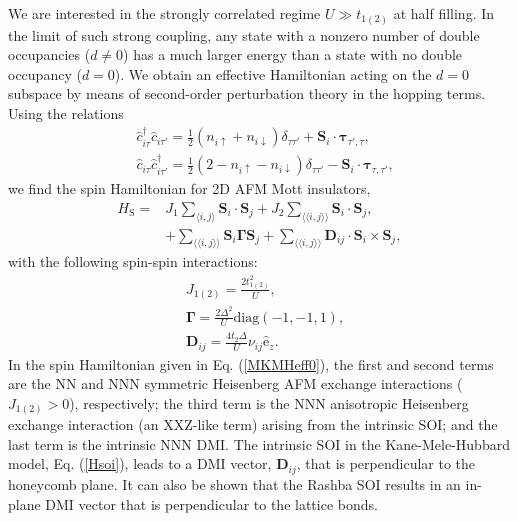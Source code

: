 \documentclass[aps,prl,twocolumn,amsmath,amssymb,nobibnotes]{revtex4-1}%
\newcommand{\n}{\nonumber}
\newcommand{\bs}{\boldsymbol}
\begin{document}
We are interested in the strongly correlated regime $U\gg t_{1(2)}$ at half filling. In the limit of such strong coupling, any state with a nonzero number of double occupancies ($d \neq 0$) has a much larger energy than a state with no double occupancy ($d=0$). We obtain an effective Hamiltonian acting on the $d=0$ subspace by means of second-order perturbation theory in the hopping terms. Using the relations
\begin{subequations}
\label{SpinOperatorInv1}
\begin{align}
&\hat{c}_{i \tau}^\dagger \hat{c}_{i \tau'} = \frac{1}{2} (n_{i \uparrow} + n_{i \downarrow})\delta_{\tau \tau'}  + \bs{S}_i\cdot\bs{\tau}_{\tau', \tau}, \\
&\hat{c}_{i \tau} \hat{c}_{i \tau'}^\dagger = \frac{1}{2} (2 - n_{i \uparrow} - n_{i \downarrow}) \delta_{\tau \tau'} - \bs{S}_i\cdot\bs{\tau}_{\tau, \tau'},
\end{align}
\end{subequations}
we find the spin Hamiltonian for 2D AFM Mott insulators,
\begin{align}
\label{MKMHeff0}
H_{\text{S}} =& J_{1}\sum_{\langle i,j \rangle} \bs{S}_i\cdot\bs{S}_j + J_{2}\sum_{\langle \langle i,j \rangle \rangle} \bs{S}_i\cdot\bs{S}_j,  \n \\
&+ \sum_{\langle \langle i,j \rangle \rangle} \bs{S}_i \bs{\Gamma} \bs{S}_j +\sum_{\langle \langle i,j \rangle \rangle} \bs{D}_{ij}\cdot \bs{S}_i \times \bs{S}_j,
\end{align}
with the following spin-spin interactions:
\begin{subequations}
\label{spin-para}
\begin{align}
&J_{1(2)} = \frac{2t_{1(2)}^2}{U}, \\
&\bs{\Gamma} =\frac{2\Delta^2}{U} \text{diag}(-1,-1,1),\\
&\bs{D}_{ij} = \frac{4 t_2 \Delta}{U}\nu_{ij}  \hat{\mathrm{e}}_z.
\end{align}
\end{subequations}
In the spin Hamiltonian given in Eq. (\ref{MKMHeff0}), the first and second terms are the NN and NNN symmetric Heisenberg AFM exchange interactions ($J_{1(2)}>0$), respectively; the third term is the NNN anisotropic Heisenberg exchange interaction (an XXZ-like term) arising from the intrinsic SOI; and the last term is the intrinsic NNN DMI. The intrinsic SOI in the Kane-Mele-Hubbard model, Eq. (\ref{Hsoi}), leads to a DMI vector, $\bs{D}_{ij}$, that is perpendicular to the honeycomb plane. It can also be shown that the Rashba SOI results in an in-plane DMI vector that is perpendicular to the lattice bonds.
\end{document}

